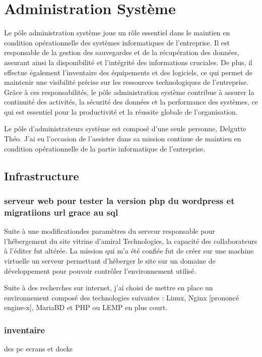 \section{Administration Système}
Le pôle administration système joue un rôle essentiel dans le maintien en condition opérationnelle des systèmes informatiques de l'entreprise.
Il est responsable de la gestion des sauvegardes et de la récupération des données, assurant ainsi la disponibilité et l'intégrité des informations cruciales.
De plus, il effectue également l'inventaire des équipements et des logiciels, ce qui permet de maintenir une visibilité précise sur les ressources technologiques de l'entreprise.
Grâce à ces responsabilités, le pôle administration système contribue à assurer la continuité des activités, la sécurité des données et la performance des systèmes, ce qui est essentiel pour la productivité et la réussite globale de l'organisation.

Le pôle d'administrateurs système est composé d'une seule personne, Delgutte Théo.
J'ai eu l'occasion de l'assister dans sa mission continue de maintien en condition opérationnelle de la partie informatique de l'entreprise.

\subsection{Infrastructure}
\subsubsection{serveur web pour tester la version php du wordpress et migratiions url grace au sql}
Suite à une modificationdes paramètres du serveur responsable pour l'hébergement du site vitrine d'amiral Technologies, la capacité des collaborateurs à l'éditer fut altérée.
La mission qui m'a été confiée fut de créer sur une machine virtuelle un serveur permettant d'héberger le site sur un domaine de développement pour pouvoir contrôler l'environnement utilisé.

Suite à des recherches sur internet, j'ai choisi de mettre en place un environnement composé des technologies suivantes : Linux, Nginx [prononcé engine-x], MariaBD et PHP ou LEMP en plus court.



\subsubsection{inventaire}
des pc ecrans et docks

